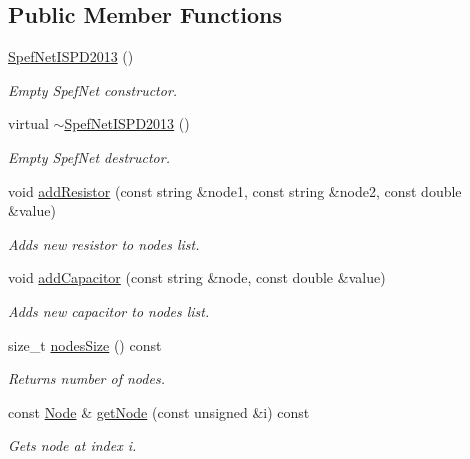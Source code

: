 \subsection*{Public Member Functions}
\begin{DoxyCompactItemize}
\item 
\hyperlink{classSpefNetISPD2013_a41ab1d666a3724e63e0fd815765f1372}{Spef\-Net\-I\-S\-P\-D2013} ()
\begin{DoxyCompactList}\small\item\em Empty Spef\-Net constructor. \end{DoxyCompactList}\item 
virtual \hyperlink{classSpefNetISPD2013_a6bd1c7cc6d7bdf677fb69bb577a6327f}{$\sim$\-Spef\-Net\-I\-S\-P\-D2013} ()
\begin{DoxyCompactList}\small\item\em Empty Spef\-Net destructor. \end{DoxyCompactList}\item 
void \hyperlink{classSpefNetISPD2013_ac837ca5049dd0fc8301b1c51a8508bfd}{add\-Resistor} (const string \&node1, const string \&node2, const double \&value)
\begin{DoxyCompactList}\small\item\em Adds new resistor to nodes list. \end{DoxyCompactList}\item 
void \hyperlink{classSpefNetISPD2013_a9d5344541f303241af6bec439a692850}{add\-Capacitor} (const string \&node, const double \&value)
\begin{DoxyCompactList}\small\item\em Adds new capacitor to nodes list. \end{DoxyCompactList}\item 
size\-\_\-t \hyperlink{classSpefNetISPD2013_a68ae22df2961b88537802d444dd20588}{nodes\-Size} () const 
\begin{DoxyCompactList}\small\item\em Returns number of nodes. \end{DoxyCompactList}\item 
const \hyperlink{structSpefNetISPD2013_1_1Node}{Node} \& \hyperlink{classSpefNetISPD2013_a8beeae8a280358ba32eedab9367b1006}{get\-Node} (const unsigned \&i) const 
\begin{DoxyCompactList}\small\item\em Gets node at index i. \end{DoxyCompactList}\item 

\end{DoxyCompactItemize}

